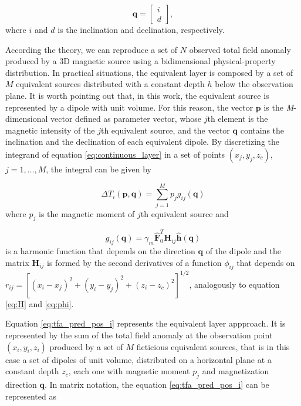  \begin{equation}
   \mathbf{q} =
   \left[ \begin{array}{c}
   i  \\ 
   d     
   \end{array} \right] ,
   \label{eq:q_vector}
 \end{equation}
 where $i$ and $d$ is the inclination and declination, respectively.

According the theory, we can reproduce a set of $N$ observed total field anomaly produced by a 3D magnetic source using a bidimensional physical-property distribution. In practical situations, the equivalent layer is composed by a set of $M$ equivalent sources distributed with a constant depth $h$ below the observation plane. It is worth pointing out that, in this work, the equivalent source is represented by a dipole with unit volume. For this reason, the vector $\mathbf{p}$ is the \textit{M}-dimensional vector defined as parameter vector, whose $j$th element is the magnetic intensity of the $j$th equivalent source, and the vector $\mathbf{q}$ contains the inclination and the declination of each equivalent dipole. By discretizing the integrand of equation \ref{eq:continuous_layer} in a set of points $(x_j,y_j,z_c)$, $j = 1, \ldots, M$, the integral can be given by

\begin{equation}
\Delta T_i (\mathbf{p},\mathbf{q})   = \sum_{j=1}^{M} p_j g_{ij} (\mathbf{q})
\label{eq:tfa_pred_pos_i}
\end{equation}    
where $p_j$ is the magnetic moment of $j$th equivalent source and 

\begin{equation}
g_{ij} (\mathbf{q})  = \gamma_m \hat{\mathbf{F}}_0^T \mathbf{H}_{ij} \hat{\mathbf{h}}(\mathbf{q})
\label{eq:g_ij}
\end{equation}
is a harmonic function that depends on the direction $\mathbf{q}$ of the dipole and the matrix $\mathbf{H}_{ij}$ is formed by the second derivatives of a function $\phi_{ij}$ that depends on $r_{ij} = [(x_i-x_j)^2 + (y_i-y_j)^2 + (z_i-z_c)^2]^{1/2}$, analogously to equation \ref{eq:H} and \ref{eq:phi}.

Equation \ref{eq:tfa_pred_pos_i} represents the equivalent layer appproach. It is represented by the sum of the total field anomaly at the observation point $(x_i,y_i,z_i)$ produced by a set of $M$ ficticious equivalent sources, that is in this case a set of dipoles of unit volume, distributed on a horizontal plane at a constant depth $z_c$, each one with magnetic moment $p_j$ and magnetization direction $\mathbf{q}$. In matrix notation, the equation \ref{eq:tfa_pred_pos_i} can be represented as 

